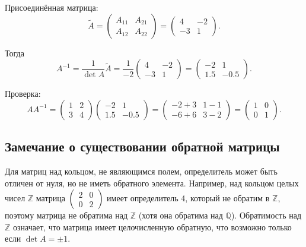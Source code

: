 \documentclass[a4paper,12pt]{article}
\theoremstyle{definition}
\theoremstyle{plain}
\theoremstyle{remark}
\begin{document}
	Присоединённая матрица:
	\[
	\tilde{A} = \begin{pmatrix} A_{11} & A_{21} \\ A_{12} & A_{22} \end{pmatrix} = \begin{pmatrix} 4 & -2 \\ -3 & 1 \end{pmatrix}.
	\]
	
	Тогда
	\[
	A^{-1} = \frac{1}{\det A} \tilde{A} = \frac{1}{-2} \begin{pmatrix} 4 & -2 \\ -3 & 1 \end{pmatrix} = \begin{pmatrix} -2 & 1 \\ 1.5 & -0.5 \end{pmatrix}.
	\]
	
	Проверка:
	\[
	A A^{-1} = \begin{pmatrix} 1 & 2 \\ 3 & 4 \end{pmatrix} \begin{pmatrix} -2 & 1 \\ 1.5 & -0.5 \end{pmatrix} = \begin{pmatrix} -2+3 & 1-1 \\ -6+6 & 3-2 \end{pmatrix} = \begin{pmatrix} 1 & 0 \\ 0 & 1 \end{pmatrix}.
	\]
	
	\subsection{Замечание о существовании обратной матрицы}
	
	Для матриц над кольцом, не являющимся полем, определитель может быть отличен от нуля, но не иметь обратного элемента. Например, над кольцом целых чисел \( \mathbb{Z} \) матрица \( \begin{pmatrix} 2 & 0 \\ 0 & 2 \end{pmatrix} \) имеет определитель 4, который не обратим в \( \mathbb{Z} \), поэтому матрица не обратима над \( \mathbb{Z} \) (хотя она обратима над \( \mathbb{Q} \)). Обратимость над \( \mathbb{Z} \) означает, что матрица имеет целочисленную обратную, что возможно только если \( \det A = \pm 1 \).
	
	
	
\end{document}
